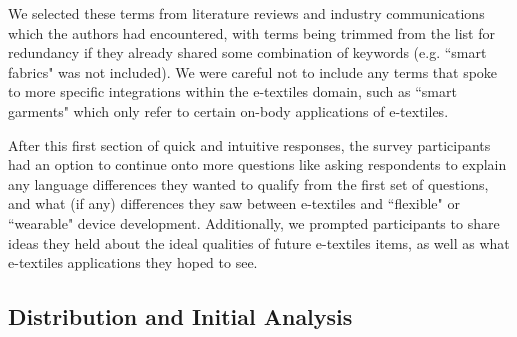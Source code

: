 We selected these terms from literature reviews and industry communications which the authors had encountered, with terms being trimmed from the list for redundancy if they already shared some combination of keywords (e.g. ``smart fabrics" was not included). We were careful not to include any terms that spoke to more specific integrations within the e-textiles domain, such as ``smart garments" which only refer to certain on-body applications of e-textiles.

After this first section of quick and intuitive responses, the survey participants had an option to continue onto more questions like asking respondents to explain any language differences they wanted to qualify from the first set of questions, and what (if any) differences they saw between e-textiles and ``flexible" or ``wearable" device development. Additionally, we prompted participants to share ideas they held about the ideal qualities of future e-textiles items, as well as what e-textiles applications they hoped to see.

\subsection{Distribution and Initial Analysis}


